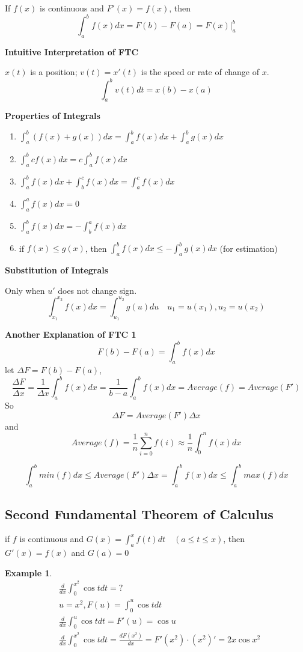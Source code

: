 \documentclass{article}
\newtheorem{exmp}{Example}
\newcommand\defint[3]{\int_{#1}^{#2}#3dx}
\begin{document}
If $f(x)$ is continuous and $F'(x) = f(x)$, then
$$\defint{a}{b}{f(x)} = F(b) - F(a) = F(x)\big|_a^b$$

\textbf{Intuitive Interpretation of FTC}

$x(t)$ is a position; $v(t) = x'(t)$ is the speed or rate of change of $x$.
$$\int_a^bv(t)dt = x(b) - x(a)$$

\textbf{Properties of Integrals}
\begin{enumerate}
  \item $\defint{a}{b}{(f(x) + g(x))} = \defint{a}{b}{f(x)} + \defint{a}{b}{g(x)}$
  \item $\defint{a}{b}{cf(x)} = c\defint{a}{b}{f(x)}$
  \item $\defint{a}{b}{f(x)} + \defint{b}{c}{f(x)} = \defint{a}{c}{f(x)}$
  \item $\defint{a}{a}{f(x)} = 0$
  \item $\defint{a}{b}{f(x)} = -\defint{b}{a}{f(x)}$
  \item if $f(x) \le g(x)$, then $\defint{a}{b}{f(x)} \le -\defint{a}{b}{g(x)}$ (for estimation)
\end{enumerate}

\textbf{Substitution of Integrals}

Only when $u'$ does not change sign.
$$\int_{x_1}^{x_2}f(x)dx = \int_{u_1}^{u_2}g(u)du \quad u_1 = u(x_1), u_2 = u(x_2)$$

\textbf{Another Explanation of FTC 1}
$$F(b) - F(a) = \int_a^bf(x)dx$$
let $\Delta F = F(b) - F(a)$,
$$\frac{\Delta F}{\Delta x} = \frac{1}{\Delta x}\int_a^bf(x)dx = \frac{1}{b-a}\int_a^bf(x)dx =Average(f) = Average(F')$$
So
$$\Delta F = Average(F')\Delta x$$
and
$$Average(f) = \frac{1}{n}\sum_{i=0}^nf(i) \approx \frac{1}{n}\int_0^nf(x)dx$$

$$\int_a^bmin(f)dx \le Average(F')\Delta x = \int_a^bf(x)dx \le \int_a^bmax(f)dx$$
\subsection{Second Fundamental Theorem of Calculus}
if $f$ is continuous and $G(x) = \int_a^xf(t)dt \quad (a \le t \le x)$, then $G'(x) = f(x)$ and $G(a) = 0$

\begin{exmp}
  \begin{align*}
    &\frac{d}{dx}\int_0^{x^2}\cos tdt = ? \\
    &u = x^2, F(u) = \int_0^u\cos tdt \\
    &\frac{d}{dx}\int_0^u\cos tdt = F'(u) = \cos u \\
    &\frac{d}{dx}\int_0^{x^2}\cos tdt = \frac{dF(x^2)}{dx} = F'(x^2)\cdot(x^2)' = 2x\cos x^2
  \end{align*}
\end{exmp}
\end{document}
